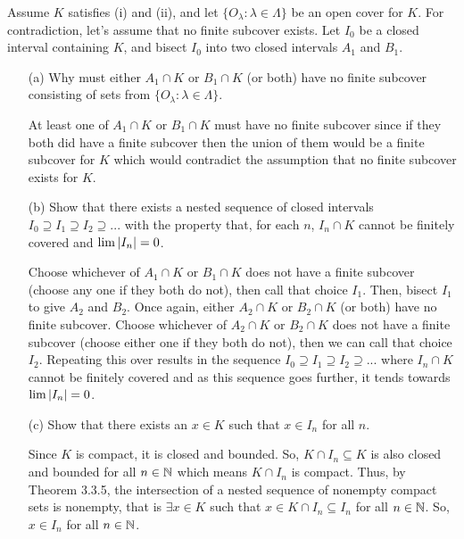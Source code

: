 \documentclass[12pt,letterpaper]{article}
\begin{document}
\begin{itemize}[leftmargin=!,labelindent=5pt]
            Assume $K$ satisfies (i) and (ii), and let $\{O_\lambda : \lambda \in \Lambda\}$ be an open cover for $K$. For contradiction, let’s assume that no finite subcover exists. Let $I_0$ be a closed interval containing $K$, and bisect $I_0$ into two closed intervals $A_1$ and $B_1$.
            \begin{itemize}
                \item [(a)] Why must either $A_1 \cap K$ or $B_1 \cap K$ (or both) have no finite subcover consisting of sets from $\{O_\lambda : \lambda \in \Lambda\}$.
                
                    At least one of $A_1 \cap K$ or $B_1 \cap K$ must have no finite subcover since if they both did have a finite subcover then the union of them would be a finite subcover for $K$ which would contradict the assumption that no finite subcover exists for $K$.
                \item [(b)] Show that there exists a nested sequence of closed intervals $I_0 \supseteq I_1 \supseteq I_2 \supseteq ... $ with the property that, for each $n$, $I_n \cap K$ cannot be finitely covered and $\lim \abs{I_n} = 0$.
                
                    Choose whichever of $A_1 \cap K$ or $B_1 \cap K$ does not have a finite subcover (choose any one if they both do not), then call that choice $I_1$.
                    Then, bisect $I_1$ to give $A_2$ and $B_2$.
                    Once again, either $A_2 \cap K$ or $B_2 \cap K$ (or both) have no finite subcover.
                    Choose whichever of $A_2 \cap K$ or $B_2 \cap K$ does not have a finite subcover (choose either one if they both do not), then we can call that choice $I_2$.
                    Repeating this over results in the sequence $I_0 \supseteq I_1 \supseteq I_2 \supseteq ... $ where $I_n \cap K$ cannot be finitely covered and as this sequence goes further, it tends towards $\lim \abs{I_n} = 0$.
                \item [(c)] Show that there exists an $x \in K$ such that $x \in I_n$ for all $n$.
                
                    Since $K$ is compact, it is closed and bounded.
                    So, $K \cap I_n \subseteq K$ is also closed and bounded for all $n \in \mathbb{N}$ which means $K \cap I_n$ is compact.
                    Thus, by Theorem 3.3.5, the intersection of a nested sequence of nonempty compact sets is nonempty, that is $\exists x \in K$ such that $x \in K \cap I_n \subseteq I_n$ for all $n \in \mathbb{N}$.
                    So, $x \in I_n$ for all $n \in \mathbb{N}$.


\end{itemize}
\end{itemize}
\end{document}
